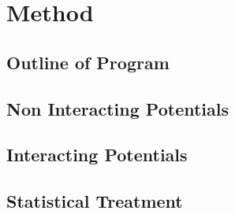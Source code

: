 \section{Method}\label{sec:Method}
\subsection{Outline of Program}
\subsection{Non Interacting Potentials}
\subsection{Interacting Potentials}
\subsection{Statistical Treatment}
